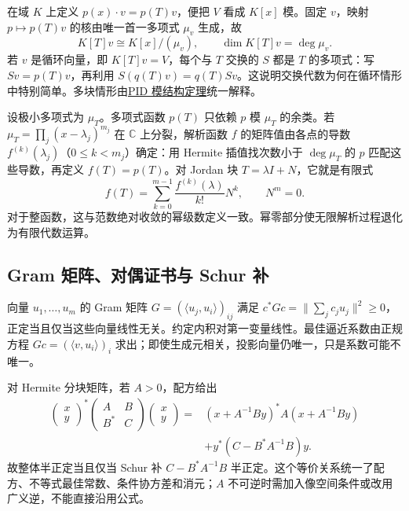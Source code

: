 \documentclass[UTF8,12pt,a4paper,fontset=fandol]{ctexart}
\begin{document}
\label{app:linear-cyclic}

在域 $K$ 上定义 $p(x)\cdot v=p(T)v$，便把 $V$ 看成 $K[x]$ 模。固定 $v$，映射 $p\mapsto p(T)v$ 的核由唯一首一多项式 $\mu_v$ 生成，故
\[
K[T]v\cong K[x]/(\mu_v),\qquad\dim K[T]v=\deg\mu_v.
\]
若 $v$ 是循环向量，即 $K[T]v=V$，每个与 $T$ 交换的 $S$ 都是 $T$ 的多项式：写 $Sv=p(T)v$，再利用 $S(q(T)v)=q(T)Sv$。这说明交换代数为何在循环情形中特别简单。多块情形由\hyperref[app:algebra-modules]{PID 模结构定理}统一解释。

设极小多项式为 $\mu_T$。多项式函数 $p(T)$ 只依赖 $p$ 模 $\mu_T$ 的余类。若 $\mu_T=\prod_j(x-\lambda_j)^{m_j}$ 在 $\mathbb C$ 上分裂，解析函数 $f$ 的矩阵值由各点的导数 $f^{(k)}(\lambda_j)$（$0\leq k<m_j$）确定：用 Hermite 插值找次数小于 $\deg\mu_T$ 的 $p$ 匹配这些导数，再定义 $f(T)=p(T)$。对 Jordan 块 $T=\lambda I+N$，它就是有限式
\[
f(T)=\sum_{k=0}^{m-1}\frac{f^{(k)}(\lambda)}{k!}N^k,
\qquad N^m=0.
\]
对于整函数，这与范数绝对收敛的幂级数定义一致。幂零部分使无限解析过程退化为有限代数运算。

\subsection{Gram 矩阵、对偶证书与 Schur 补}

\label{app:linear-gram}

向量 $u_1,\ldots,u_m$ 的 Gram 矩阵 $G=(\langle u_j,u_i\rangle)_{ij}$ 满足 $c^*Gc=\|\sum_jc_ju_j\|^2\geq0$，正定当且仅当这些向量线性无关。约定内积对第一变量线性。最佳逼近系数由正规方程 $Gc=(\langle v,u_i\rangle)_i$ 求出；即使生成元相关，投影向量仍唯一，只是系数可能不唯一。

对 Hermite 分块矩阵，若 $A>0$，配方给出
\[
\begin{aligned}
\begin{pmatrix}x\\y\end{pmatrix}^*
\begin{pmatrix}A&B\\B^*&C\end{pmatrix}
\begin{pmatrix}x\\y\end{pmatrix}
={}&(x+A^{-1}By)^*A(x+A^{-1}By)\\
&+y^*(C-B^*A^{-1}B)y.
\end{aligned}
\]
故整体半正定当且仅当 Schur 补 $C-B^*A^{-1}B$ 半正定。这个等价关系统一了配方、不等式最佳常数、条件协方差和消元；$A$ 不可逆时需加入像空间条件或改用广义逆，不能直接沿用公式。
\end{document}
